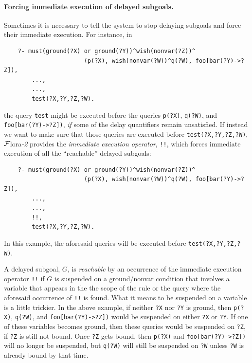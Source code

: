 \documentclass[11pt]{article}
\newcommand{\FLORA}{{\mbox{\sc ${\cal F}${lora}\rm\emph{-2}}}\xspace}
\begin{document}
\index{!!}
\paragraph{Forcing immediate execution of delayed subgoals.}
Sometimes it is necessary to tell the system to stop delaying
subgoals and force their immediate execution.
For instance, in
\begin{verbatim}
    ?- must(ground(?X) or ground(?Y))^wish(nonvar(?Z))^
                       (p(?X), wish(nonvar(?W))^q(?W), foo[bar(?Y)->?Z]),
        ...,
        ...,
        test(?X,?Y,?Z,?W).
\end{verbatim}
the query \texttt{test} might be executed before the queries \texttt{p(?X)},
\texttt{q(?W)}, and \texttt{foo[bar(?Y)->?Z])}, \emph{if} some of the
delay quantifiers remain unsatisfied. If instead we want
to make sure that those queries are executed before
\texttt{test(?X,?Y,?Z,?W)}, \FLORA provides the \emph{immediate execution
operator}, \texttt{!!},
which forces immediate execution of all the ``reachable'' delayed subgoals:
\begin{verbatim}
    ?- must(ground(?X) or ground(?Y))^wish(nonvar(?Z))^
                       (p(?X), wish(nonvar(?W))^q(?W), foo[bar(?Y)->?Z]),
        ...,
        ...,
        !!,
        test(?X,?Y,?Z,?W).
\end{verbatim}
In this example, the aforesaid queries will be executed before
\texttt{test(?X,?Y,?Z,?W)}. 

A delayed subgoal, $G$, is \emph{reachable} by an occurrence of
the immediate execution
operator \texttt{!!} 
if $G$ is suspended on a ground/nonvar condition that
involves a variable that appears in the the scope of the rule or the query
where the aforesaid occurrence of \texttt{!!} is found. 
What it means to be suspended on a variable is a little trickier.
In the above example, if neither \texttt{?X} nor \texttt{?Y} is ground,
then \texttt{p(?X)}, \texttt{q(?W)}, and \texttt{foo[bar(?Y)->?Z])} would
be suspended on either \texttt{?X} or \texttt{?Y}. If one of these
variables becomes ground, then these queries would be suspended on
\texttt{?Z}, if \texttt{?Z} is still not bound.  Once \texttt{?Z}  gets bound,
then \texttt{p(?X)} and \texttt{foo[bar(?Y)->?Z])} will no longer be
suspended, but \texttt{q(?W)} will still be suspended on \texttt{?W} unless
\texttt{?W} is already bound by that time.   
\end{document}
